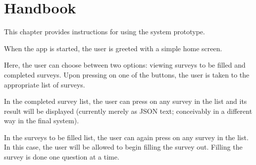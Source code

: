 \chapter{Handbook}
\label{chap:handbook}
This chapter provides instructions for using the system prototype.

When the app is started, the user is greeted with a simple home screen.

Here, the user can choose between two options: viewing surveys to be filled and completed surveys. Upon pressing on one of the buttons, the user is taken to the appropriate list of surveys.

In the completed survey list, the user can press on any survey in the list and its result will be displayed (currently merely as JSON text; conceivably in a different way in the final system).

In the surveys to be filled list, the user can again press on any survey in the list. In this case, the user will be allowed to begin filling the survey out. Filling the survey is done one question at a time.
